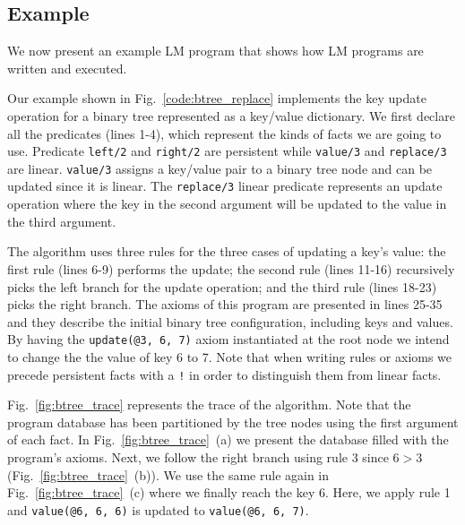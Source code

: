 \subsection{Example}

We now present an example LM program that shows how LM programs are written and executed.

Our example shown in Fig.~\ref{code:btree_replace} implements the key update operation for a binary tree
represented as a key/value dictionary.
We first declare all the predicates (lines 1-4), which represent the kinds of facts we are going to use.
Predicate \texttt{left/2} and \texttt{right/2} are persistent while \texttt{value/3} and \texttt{replace/3} are linear.
\texttt{value/3} assigns a key/value pair to a binary tree node and can
be updated since it is linear. The \texttt{replace/3} linear predicate represents an update operation where the key in
the second argument will be updated to the value in the third argument.

The algorithm uses three rules for the three cases of updating a key's value: the first rule (lines 6-9) performs the update;
the second rule (lines 11-16) recursively picks the left branch for the update operation; and the third rule (lines 18-23) picks the right branch.
The axioms of this program are presented in lines 25-35 and they describe the initial binary tree configuration, including keys and values.
By having the \texttt{update(@3, 6, 7)} axiom instantiated at the root node we intend to change the the value of key 6 to 7.
Note that when writing rules or axioms we precede persistent facts with a \texttt{!} in order to distinguish them from linear facts.

Fig.~\ref{fig:btree_trace} represents the trace of the algorithm. Note that the program database has been partitioned
by the tree nodes using the first argument of each fact. In Fig.~\ref{fig:btree_trace}~(a) we present the database
filled with the program's axioms. Next, we follow the right branch using rule 3 since $6 > 3$ (Fig.~\ref{fig:btree_trace}~(b)).
We use the same rule again in Fig.~\ref{fig:btree_trace}~(c) where we finally reach the key 6. Here, we apply rule 1 and
\texttt{value(@6, 6, 6)} is updated to \texttt{value(@6, 6, 7)}.

